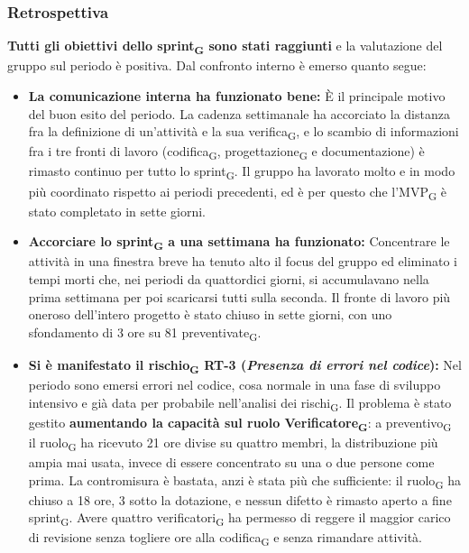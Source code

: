 ﻿\documentclass[a4paper, 10pt, colorlinks=true, linkcolor=black, urlcolor=blue, citecolor=blue, hidelinks]{article}
\begin{document}
\subsubsection{Retrospettiva}
\textbf{Tutti gli obiettivi dello sprint\textsubscript{G} sono stati raggiunti} e la valutazione del gruppo sul periodo è positiva. Dal confronto interno è emerso quanto segue:
\begin{itemize}
    \item \textbf{La comunicazione interna ha funzionato bene:} È il principale motivo del buon esito del periodo. La cadenza settimanale ha accorciato la distanza fra la definizione di un'attività e la sua verifica\textsubscript{G}, e lo scambio di informazioni fra i tre fronti di lavoro (codifica\textsubscript{G}, progettazione\textsubscript{G} e documentazione) è rimasto continuo per tutto lo sprint\textsubscript{G}. Il gruppo ha lavorato molto e in modo più coordinato rispetto ai periodi precedenti, ed è per questo che l'MVP\textsubscript{G} è stato completato in sette giorni.

    \item \textbf{Accorciare lo sprint\textsubscript{G} a una settimana ha funzionato:} Concentrare le attività in una finestra breve ha tenuto alto il focus del gruppo ed eliminato i tempi morti che, nei periodi da quattordici giorni, si accumulavano nella prima settimana per poi scaricarsi tutti sulla seconda. Il fronte di lavoro più oneroso dell'intero progetto è stato chiuso in sette giorni, con uno sfondamento di 3 ore su 81 preventivate\textsubscript{G}.

    \item \textbf{Si è manifestato il rischio\textsubscript{G} RT-3 (\textit{Presenza di errori nel codice}):} Nel periodo sono emersi errori nel codice, cosa normale in una fase di sviluppo intensivo e già data per probabile nell'analisi dei rischi\textsubscript{G}. Il problema è stato gestito \textbf{aumentando la capacità sul ruolo Verificatore\textsubscript{G}}: a preventivo\textsubscript{G} il ruolo\textsubscript{G} ha ricevuto 21 ore divise su quattro membri, la distribuzione più ampia mai usata, invece di essere concentrato su una o due persone come prima. La contromisura è bastata, anzi è stata più che sufficiente: il ruolo\textsubscript{G} ha chiuso a 18 ore, 3 sotto la dotazione, e nessun difetto è rimasto aperto a fine sprint\textsubscript{G}. Avere quattro verificatori\textsubscript{G} ha permesso di reggere il maggior carico di revisione senza togliere ore alla codifica\textsubscript{G} e senza rimandare attività.


\end{itemize}
\end{document}
